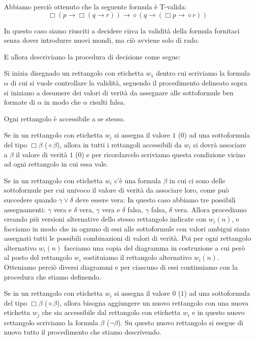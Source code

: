 \documentclass[a4paper, 12pt]{article}
\begin{document}
Abbiamo perciò ottenuto che la seguente formula è T-valida:
$$\Box(p \rightarrow \Box(q \rightarrow r)) \rightarrow \diamond(q \rightarrow (\Box p \rightarrow \diamond r))$$

In questo caso siamo riusciti a decidere circa la validità della formula fornitaci
senza dover introdurre nuovi mondi, ma ciò avviene solo di rado.

E allora descriviamo la procedura di decisione come segue:

Si inizia disegnado un rettangolo  con etichetta $w_1$ dentro cui scriviamo la formula $\alpha$
di cui si vuole controllare la validità, seguendo il procedimento delineato sopra
si iniziano a desumere dei valori di verità da assegnare alle sottoformule ben formate di $\alpha$
in modo che $\alpha$ risulti falsa.

Ogni rettangolo è accessibile a se stesso.

Se in un rettangolo con etichetta $w_i$ si assegna il valore $1$ ($0$) ad una sottoformula
del tipo $\Box \beta$ ($\diamond \beta$), allora in tutti i rettangoli accessibili da $w_i$ si dovrà
associare a $\beta$ il valore di verità $1$ ($0$) e per ricordarcelo scriviamo questa condizione
vicino ad ogni rettangolo in cui essa vale.

Se in un rettangolo con etichetta $w_i$ c'è una formula $\beta$
in cui ci sono delle sottoformule per cui univoco il valore di verità da associare loro,
come può succedere quando $\gamma \lor \delta$ deve essere vera: In questo caso abbiamo
tre possibili assegnamenti:
$\gamma$ vera e $\delta$ vera, $\gamma$ vera e $\delta$ falsa, $\gamma$ falsa, $\delta$ vera.
Allora procediamo creando più versioni alternative dello stesso rettangolo indicate con $w_i(n)$,
e facciamo in modo che in ognuno di essi alle sottoformule con valori ambigui siano assegnati
tutti le possibili combinazioni di valori di verità.
Poi per ogni rettangolo alternativo $w_i(n)$ facciamo una copia del diagramma in costruzione
a cui però al posto del rettangolo $w_i$ sostituiamo il
rettangolo alternativo $w_i(n)$. Otteniamo perciò diversi diagrammi
e per ciascuno di essi continuiamo con la procedura che stiamo definendo.

Se in un rettangolo con etichetta $w_i$ si assegna il valore $0$ ($1$) ad una sottoformula
del tipo $\Box \beta$ ($\diamond \beta$), allora bisogna aggiungere un nuovo
rettangolo con una nuova etichetta $w_j$ che sia accessibile dal rettangolo con etichetta $w_i$
e in questo nuovo rettangolo scriviamo la formula $\beta$ ($\neg \beta$).
Su questo nuovo rettangolo si esegue di nuovo tutto il procedimento che stiamo descrivendo.
\end{document}
